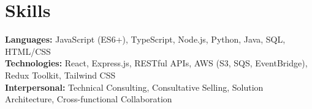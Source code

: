 \documentclass[11pt]{article}       %
\begin{document}
\vspace{-18.5pt}


\section*{Skills}
\textbf{Languages:} JavaScript (ES6+), TypeScript, Node.js, Python, Java, SQL, HTML/CSS\\
\textbf{Technologies:} React, Express.js, RESTful APIs, AWS (S3, SQS, EventBridge), Redux Toolkit, Tailwind CSS\\
\textbf{Interpersonal:} Technical Consulting, Consultative Selling, Solution Architecture, Cross-functional Collaboration\\

\vspace{-6.5pt}
\end{document}
